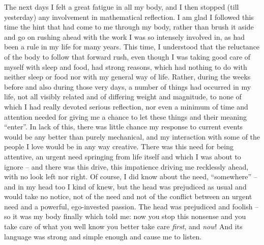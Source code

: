 The next days I felt a great fatigue in all my body, and I then
stopped (till yesterday) any involvement in mathematical reflection. I
am glad I followed this time the hint that had come to me through my
body, rather than brush it aside and go on rushing ahead with the work
I was so intensely involved in, as had been a rule in my life for many
years. This time, I understood that the reluctance of the body to
follow that forward rush, even though I was taking good care of myself
with sleep and food, had strong reasons, which had nothing to do with
neither sleep or food nor with my general way of life. Rather, during
the weeks before and also during those very days, a number of things
had occurred in my life, not all visibly related and of differing
weight and magnitude, to none of which I had really devoted serious
reflection, nor even a minimum of time and attention needed for giving
me a chance to let these things and their meaning
``enter''. In lack of this, there was little chance my response to
current events would be any better than purely mechanical, and my
interaction with some of the people I love would be in any way
creative. There was this need for being attentive, an urgent need
springing from life itself and which I was about to ignore -- and
there was this drive, this impatience driving me recklessly ahead,
with no look left nor right. Of course, I did know about the need,
``somewhere'' -- and in my head too I kind of knew, but the head was
prejudiced as usual and would take no notice, not of the need and not
of the conflict between an urgent need and a powerful, ego-invested
passion. The head was prejudiced and foolish -- so it was my body
finally which told me: now you stop this nonsense and you take care of
what you well know you better take care \emph{first}, and \emph{now}!
And its language was strong and simple enough and cause me to listen.

